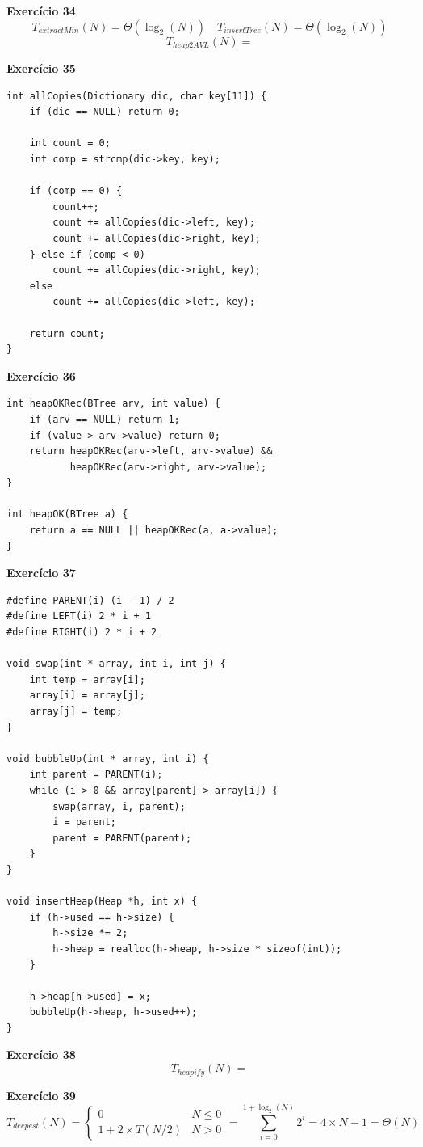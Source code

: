 \documentclass[a4paper,11pt]{article}
\begin{document}
\newpage

\noindent \textbf{Exercício 34}
\[
	T_{extractMin}(N) = \Theta(\log_2(N)) \quad T_{insertTree}(N) = \Theta(\log_2(N))
\]
\[
	T_{heap2AVL}(N) = 
\]

\noindent \textbf{Exercício 35}

\begin{verbatim}
int allCopies(Dictionary dic, char key[11]) {
	if (dic == NULL) return 0;
	
	int count = 0;
	int comp = strcmp(dic->key, key);
	
	if (comp == 0) {
		count++;
		count += allCopies(dic->left, key);
		count += allCopies(dic->right, key);
	} else if (comp < 0)
		count += allCopies(dic->right, key);
	else
		count += allCopies(dic->left, key);
	
	return count;
}
\end{verbatim}

\noindent \textbf{Exercício 36}

\begin{verbatim}
int heapOKRec(BTree arv, int value) {
	if (arv == NULL) return 1;
	if (value > arv->value) return 0;
	return heapOKRec(arv->left, arv->value) &&
		   heapOKRec(arv->right, arv->value);
}

int heapOK(BTree a) {
	return a == NULL || heapOKRec(a, a->value);
}
\end{verbatim}

\noindent \textbf{Exercício 37}

\begin{verbatim}
#define PARENT(i) (i - 1) / 2
#define LEFT(i) 2 * i + 1
#define RIGHT(i) 2 * i + 2

void swap(int * array, int i, int j) {
	int temp = array[i];
	array[i] = array[j];
	array[j] = temp;
}

void bubbleUp(int * array, int i) {
	int parent = PARENT(i);
	while (i > 0 && array[parent] > array[i]) {
		swap(array, i, parent);
		i = parent;
		parent = PARENT(parent);
	}
}

void insertHeap(Heap *h, int x) {
	if (h->used == h->size) {
		h->size *= 2;
		h->heap = realloc(h->heap, h->size * sizeof(int));
	}
	
	h->heap[h->used] = x;
	bubbleUp(h->heap, h->used++);
}

\end{verbatim}

\noindent \textbf{Exercício 38}~
\[
	T_{heapify}(N) = 
\]

\noindent \textbf{Exercício 39}
\[
T_{deepest}(N) = 
\begin{cases}
	0 & N \leq 0 \\
	1 + 2 \times T(N/2) & N > 0
\end{cases}
= \sum_{i=0}^{1+\log_2(N)} 2^i = 4 \times N - 1 = \Theta(N)
\]
\end{document}
